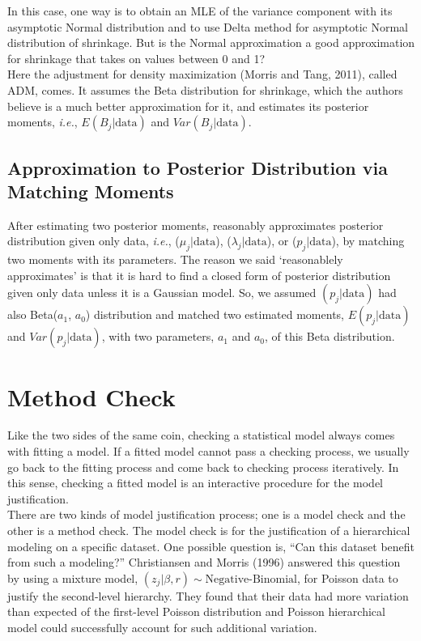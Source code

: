 \documentclass[article]{jss}
\begin{document}
In this case, one way is to obtain an MLE of the variance component with its asymptotic Normal distribution and to use Delta method for asymptotic Normal distribution of shrinkage. But is the Normal approximation a good approximation for shrinkage that takes on values between 0 and 1?
\\

Here the adjustment for density maximization (Morris and Tang, 2011), called ADM, comes. It assumes the Beta distribution for shrinkage, which the authors believe is a much better approximation for it, and estimates its posterior moments, \emph{i.e.}, $E(B_{j}\vert\textrm{data})$ and $Var(B_{j}\vert\textrm{data})$.

\subsection[Approximation to Posterior Distribution by Moment Matching]{Approximation to Posterior Distribution via Matching Moments}
After estimating two posterior moments,  reasonably approximates posterior distribution given only data, \emph{i.e.}, ($\mu_{j}\vert \textrm{data}$), ($\lambda_{j}\vert \textrm{data}$), or ($p_{j}\vert \textrm{data}$), by matching two moments with its parameters. The reason we said `reasonablely approximates' is that it is hard to find a closed form of posterior distribution given only data unless it is a Gaussian model. So, we assumed $(p_{j}\vert \textrm{data})$ had also Beta($a_{1}$, $a_{0}$) distribution and matched two estimated moments, $E(p_{j}\vert \textrm{data})$ and $Var(p_{j}\vert \textrm{data})$, with two parameters, $a_{1}$ and $a_{0}$, of this Beta distribution. 

\section[Method Check]{Method Check}
Like the two sides of the same coin, checking a statistical model always comes with fitting a model. If a fitted model cannot pass a checking process, we usually go back to the fitting process and come back to checking process iteratively. In this sense, checking a fitted model is an interactive procedure for the model justification.
\\

There are two kinds of model justification process; one is a model check and the other is a method check. The model check is for the justification of a hierarchical modeling on a specific dataset. One possible question is, ``Can this dataset benefit from such a modeling?'' Christiansen and Morris (1996) answered this question by using a mixture model, $(z_{j}\vert \beta, r)\sim\textrm{Negative-Binomial}$, for Poisson data to justify the second-level hierarchy. They found that their data had more variation than expected of the first-level Poisson distribution and Poisson hierarchical model could successfully account for such additional variation.
\\
\end{document}
